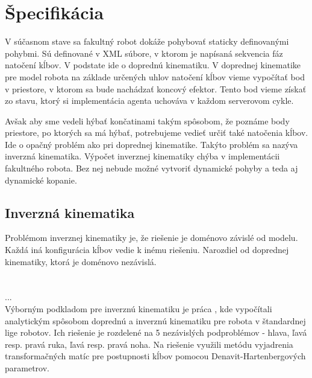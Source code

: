 \section{Špecifikácia} \label{sec_specification}

V súčasnom stave sa fakultný robot dokáže pohybovať staticky definovanými pohybmi. Sú definované v XML súbore, v ktorom je napísaná sekvencia fáz natočení kĺbov. V podstate ide o doprednú kinematiku. V doprednej kinematike pre model robota na základe určených uhlov natočení kĺbov vieme vypočítať bod v priestore, v ktorom sa bude nachádzať koncový efektor. Tento bod vieme získať zo stavu, ktorý si implementácia agenta uchováva v každom serverovom cykle.

Avšak aby sme vedeli hýbať končatinami takým spôsobom, že poznáme body priestore, po ktorých sa má hýbať, potrebujeme vedieť určiť také natočenia kĺbov. Ide o opačný problém ako pri doprednej kinematike. Takýto problém  sa nazýva inverzná kinematika. Výpočet inverznej kinematiky chýba v implementácii fakultného robota. Bez nej nebude možné vytvoriť dynamické pohyby a teda aj dynamické kopanie.

\subsection{Inverzná kinematika}
Problémom inverznej kinematiky je, že riešenie je doménovo závislé od modelu. Každá iná konfigurácia kĺbov vedie k inému riešeniu. Narozdiel od doprednej kinematiky, ktorá je doménovo nezávislá.
\\\\\\
...
\\
Výborným podkladom pre inverznú kinematiku je práca \cite{kofinas, kofinas_master}, kde vypočítali analytickým spôsobom doprednú a inverznú kinematiku pre robota v štandardnej lige robotov. Ich riešenie je rozdelené na 5 nezávislých podproblémov - hlava, ľavá resp. pravá ruka, ľavá resp. pravá noha. Na riešenie využili metódu vyjadrenia transformačných matíc pre postupnosti kĺbov pomocou Denavit-Hartenbergových parametrov.

